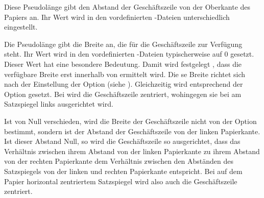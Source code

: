 \begin{Declaration}
\end{Declaration}
Diese Pseudolänge gibt den Abstand der Geschäftszeile von der Oberkante des
Papiers an. Ihr Wert wird in den vordefinierten
-Dateien
unterschiedlich eingestellt. %
\iffalse%
Typische Werte liegen zwischen 80{,}5\Unit{mm} und 98{,}5\Unit{mm}.%
\fi%
\EndIndexGroup


\begin{Declaration}
\end{Declaration}
Die Pseudolänge  gibt die Breite an, die für die
Geschäftszeile zur Verfügung steht. Ihr Wert wird in den vordefinierten
-Dateien typischerweise auf 0
gesetzt. Dieser Wert hat eine besondere Bedeutung. %
\iffalse%
Es wird damit keineswegs festgelegt, dass für die Geschäftszeile keine Breite
zur Verfügung steht. Vielmehr bedeutet der Wert%
\else%
Damit wird festgelegt%
\fi%
, dass die verfügbare Breite erst innerhalb von
 ermittelt wird.  Die%
\iffalse%
\ dort ermittelte %
\else%
se %
\fi%
Breite richtet sich nach der Einstellung der Option
%
 (siehe
). Gleichzeitig wird 
 entsprechend der Option gesetzt. Bei
%
 wird die Geschäftszeile zentriert,
wohingegen sie bei %
 am Satzspiegel links ausgerichtet
wird.

Ist  von Null verschieden, wird die Breite der
Geschäftszeile nicht von der Option 
bestimmt, sondern  ist der Abstand der Geschäftszeile von der
linken Papierkante. Ist dieser Abstand Null, so wird die
Geschäftszeile so ausgerichtet, dass das Verhältnis zwischen ihrem Abstand von
der linken Papierkante zu ihrem Abstand von der rechten Papierkante dem
Verhältnis zwischen den Abständen des Satzspiegels von der linken und rechten
Papierkante entspricht. Bei auf dem Papier horizontal zentriertem Satzspiegel
wird also auch die Geschäftszeile zentriert.

